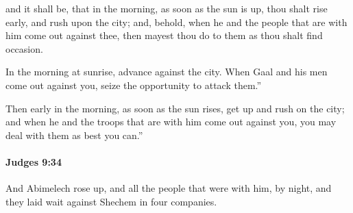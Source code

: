 			\begin{versebox}
					\item[BHS] 
					\item[ASV] and it shall be, that in the morning, as soon as the sun is up, thou shalt rise early, and rush upon the city; and, behold, when he and the people that are with him come out against thee, then mayest thou do to them as thou shalt find occasion.
					\item[NIV] In the morning at sunrise, advance against the city. When Gaal and his men come out against you, seize the opportunity to attack them.”
					\item[NRSV] Then early in the morning, as soon as the sun rises, get up and rush on the city; and when he and the troops that are with him come out against you, you may deal with them as best you can.”
			\end{versebox}

		\paragraph{Judges 9:34} %
			\label{JUDGES-9-34}

			And Abimelech rose up, and all the people that were with him, by night, and they laid wait against Shechem in four companies.


